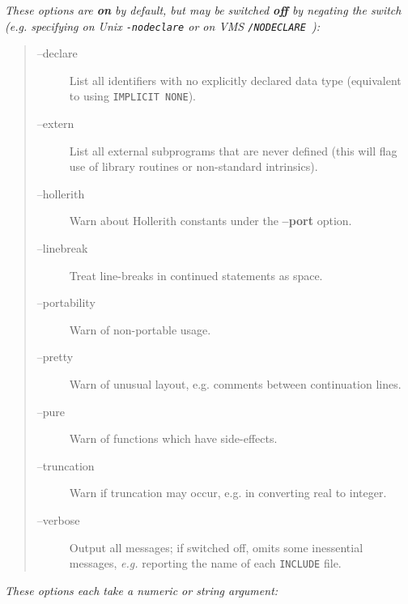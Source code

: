 \documentclass[twoside,11pt,nolof]{starlink}
\begin{document}
\emph{These options are \textbf{on} by default, but may be switched \textbf{off} by negating the switch (e.g. specifying on Unix \texttt{-nodeclare} or
on VMS \texttt{/NODECLARE }):}

\begin{quote}
\begin{description}

\item [--declare] List all identifiers with no
explicitly declared data type (equivalent to using \texttt{IMPLICIT NONE}).

\item [--extern] List all external subprograms that are never
defined (this will flag use of library routines or non-standard
intrinsics).

\item [--hollerith] Warn about Hollerith constants under the \textbf{--port} option.

\item [--linebreak] Treat line-breaks in continued statements as space.

\item [--portability] Warn of non-portable usage.

\item [--pretty] Warn of unusual layout, e.g. comments between continuation
lines.

\item [--pure] Warn of functions which have side-effects.

\item [--truncation] Warn if truncation may occur, e.g. in
converting real to integer.

\item [--verbose] Output all messages; if switched off, omits some
inessential messages, \emph{e.g.} reporting the name of each
\texttt{INCLUDE} file.

\end{description}
\end{quote}

\emph{These options each take a numeric or string argument:}
\end{document}
